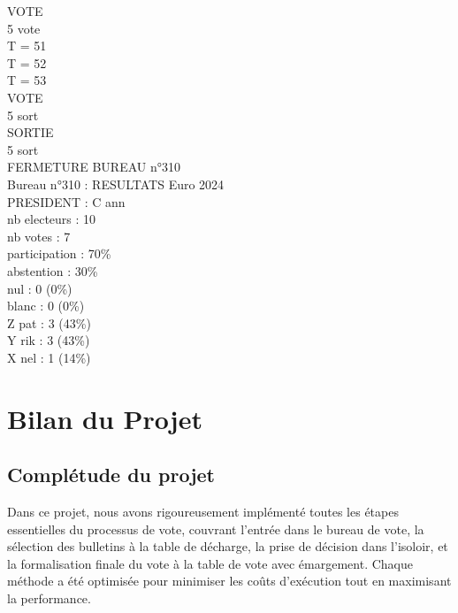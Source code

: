 \documentclass[12pt]{article} %
\begin{document}
\begin{multicols}{3}
{			\hspace*{5mm} VOTE\\
			\hspace*{12mm} 5 vote\\
			T = 51\\
			T = 52\\
			T = 53\\
			\hspace*{5mm} VOTE\\
			\hspace*{12mm} 5 sort\\
			\hspace*{5mm} SORTIE\\
			\hspace*{12mm} 5 sort\\
			
			\noindent FERMETURE BUREAU n°310\\
			
			\noindent Bureau n°310 : RESULTATS Euro 2024 \\
			\hspace*{6mm} PRESIDENT : C ann \\
			\hspace*{6mm} nb electeurs : 10 \\
			\hspace*{6mm} nb votes : 7 \\
			\hspace*{6mm} participation : 70\% \\
			\hspace*{6mm} abstention : 30\% \\
			\hspace*{6mm} nul : 0 (0\%) \\
			\hspace*{6mm} blanc : 0 (0\%) \\
			\hspace*{6mm} Z pat : 3 (43\%) \\
			\hspace*{6mm} Y rik : 3 (43\%) \\
			\hspace*{6mm} X nel : 1 (14\%) \\
	}
	\end{multicols}
	
	\newpage
	
	\section*{Bilan du Projet}
	\subsection*{Complétude du projet}
	Dans ce projet, nous avons rigoureusement implémenté toutes les étapes essentielles du processus de vote, couvrant l'entrée dans le bureau de vote, la sélection des bulletins à la table de décharge, la prise de décision dans l'isoloir, et la formalisation finale du vote à la table de vote avec émargement. Chaque méthode a été optimisée pour minimiser les coûts d'exécution tout en maximisant la performance.
	
\end{document}
